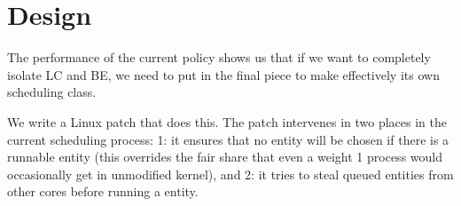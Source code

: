 \section{Design}\label{design}

The performance of the current \schedidle{} policy shows us that if we want to
completely isolate LC and BE, we need to put in the final piece to make
\schedidle{} effectively its own scheduling class.

We write a Linux patch that does this. The patch intervenes in two places in the
current scheduling process: 1: it ensures that no \schedidle{} entity will be
chosen if there is a runnable \schednormal{} entity (this overrides the fair
share that even a weight 1 process would occasionally get in unmodified kernel),
and 2: it tries to steal queued \schednormal{} entities from other cores before
running a \schedidle{} entity.

